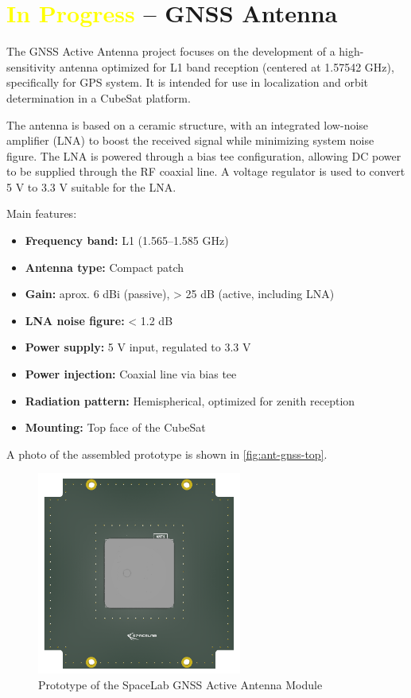 \section{\textcolor{yellow}{In Progress} – GNSS Antenna}

The GNSS Active Antenna project focuses on the development of a high-sensitivity antenna optimized for L1 band reception (centered at 1.57542 GHz), specifically for GPS system. It is intended for use in localization and orbit determination in a CubeSat platform.

The antenna is based on a ceramic structure, with an integrated low-noise amplifier (LNA) to boost the received signal while minimizing system noise figure. The LNA is powered through a bias tee configuration, allowing DC power to be supplied through the RF coaxial line. A voltage regulator is used to convert 5 V to 3.3 V suitable for the LNA.

Main features:
\begin{itemize}
    \item \textbf{Frequency band:} L1 (1.565–1.585 GHz)
    \item \textbf{Antenna type:} Compact patch
    \item \textbf{Gain:} aprox. 6 dBi (passive), > 25 dB (active, including LNA)
    \item \textbf{LNA noise figure:} < 1.2 dB
    \item \textbf{Power supply:} 5 V input, regulated to 3.3 V
    \item \textbf{Power injection:} Coaxial line via bias tee
    \item \textbf{Radiation pattern:} Hemispherical, optimized for zenith reception
    \item \textbf{Mounting:} Top face of the CubeSat
\end{itemize}

A photo of the assembled prototype is shown in \autoref{fig:ant-gnss-top}.

\begin{figure}[!ht]
    \centering
    \includegraphics[width=0.6\textwidth]{figures/subsystems/gnss-active-antenna-top.png}
    \caption{Prototype of the SpaceLab GNSS Active Antenna Module}
    \label{fig:ant-gnss-top}
\end{figure}

